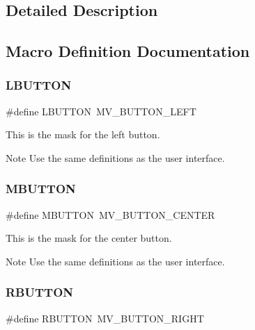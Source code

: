 \subsection{Detailed Description}


\subsection{Macro Definition Documentation}
\mbox{\label{group__libmisc__mouseparser_ga7beb9682b87ae7b91cdb9148411ffb1e}} 
\subsubsection{\texorpdfstring{LBUTTON}{LBUTTON}}
{\footnotesize\ttfamily \#define L\+B\+U\+T\+T\+ON~M\+V\+\_\+\+B\+U\+T\+T\+O\+N\+\_\+\+L\+E\+FT}

This is the mask for the left button.

\begin{DoxyNote}{Note}
Use the same definitions as the user interface. 
\end{DoxyNote}
\mbox{\label{group__libmisc__mouseparser_ga01d661af045b5e9e3ecbe6a36e533044}} 
\subsubsection{\texorpdfstring{MBUTTON}{MBUTTON}}
{\footnotesize\ttfamily \#define M\+B\+U\+T\+T\+ON~M\+V\+\_\+\+B\+U\+T\+T\+O\+N\+\_\+\+C\+E\+N\+T\+ER}

This is the mask for the center button.

\begin{DoxyNote}{Note}
Use the same definitions as the user interface. 
\end{DoxyNote}
\mbox{\label{group__libmisc__mouseparser_ga98086f239e2514a82512a9caf0c10f91}} 
\subsubsection{\texorpdfstring{RBUTTON}{RBUTTON}}
{\footnotesize\ttfamily \#define R\+B\+U\+T\+T\+ON~M\+V\+\_\+\+B\+U\+T\+T\+O\+N\+\_\+\+R\+I\+G\+HT}

